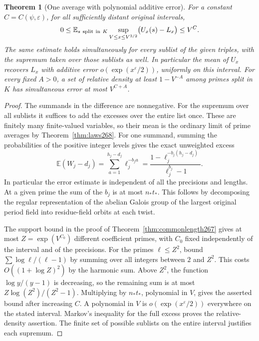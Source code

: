 \documentclass[a4paper,11pt]{article}
\newtheorem{theorem}[proposition]{Theorem}
\theoremstyle{definition}
\theoremstyle{remark}
\numberwithin{equation}{section}
\begin{document}
\begin{theorem}[One average with polynomial additive error]\leavevmode
\label{thm:mean268}
For a constant \(C=C(\psi,\varepsilon)\), for all sufficiently
distant original intervals,
\[
 0\le {\mathbb E}_{s\ {\rm split\ in}\ K}
       \sup_{V\le x\le V^{3/2}}\bigl(U_x(s)-L_x\bigr)
       \le V^C .
\]
The same estimate holds simultaneously for every sublist of
the given triples, with the supremum taken over those sublists
as well. In particular the mean of \(U_x\) recovers \(L_x\)
with additive error \(o(\exp(x^\varepsilon/2))\), uniformly
on this interval. For every fixed \(A>0\), a set of relative
density at least \(1-V^{-A}\) among primes split in \(K\)
has simultaneous error at most \(V^{C+A}\).
\end{theorem}
\begin{proof}
The summands in the difference are nonnegative. For the
supremum over all sublists it suffices to add the excesses
over the entire list once. These are finitely many
finite-valued variables, so their mean is the ordinary
limit of prime averages by Theorem~\ref{thm:laws268}. For
one summand, summing the probabilities of the positive
integer levels gives the exact unweighted excess
\[
 {\mathbb E}(W_j-d_j)
    =\sum_{a=1}^{h_j-d_j}\ell_j^{-b_j a}
    =\frac{1-\ell_j^{-b_j(h_j-d_j)}}{\ell_j^{b_j}-1}.
\]
In particular the error estimate is independent of all the
precisions and lengths. At a given prime the sum of the
\(b_j\) is at most \(n_*t_*\). This follows by decomposing
the regular representation of the abelian Galois group of
the largest original period field into residue-field
orbits at each twist.

The support bound in the proof of
Theorem~\ref{thm:commonlength267} gives at most
\(Z=\exp(V^{C_0})\) different coefficient primes, with \(C_0\)
fixed independently of the interval and of the precisions.
For the primes \(\ell\le Z^2\), bound
\(\sum \log\ell/(\ell-1)\) by summing over all integers
between \(2\) and \(Z^2\). This costs
\(O((1+\log Z)^2)\) by the harmonic sum. Above \(Z^2\),
the function \(\log y/(y-1)\) is decreasing, so the
remaining sum is at most \(Z\log(Z^2)/(Z^2-1)\).
Multiplying by \(n_*t_*\), polynomial in \(V\), gives the
asserted bound after increasing \(C\). A polynomial in \(V\)
is \(o(\exp(x^\varepsilon/2))\) everywhere on the stated
interval. Markov's inequality for the full excess proves the
relative-density assertion. The finite set of possible
sublists on the entire interval justifies each supremum.
\end{proof}
\end{document}
